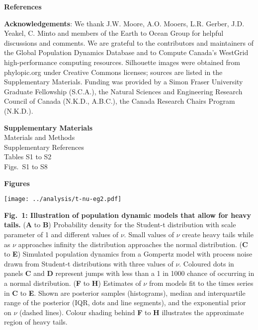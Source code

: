 \textbf{References}

\renewcommand{\section}[2]{}%



\textbf{Acknowledgements}: We thank J.W. Moore, A.O. Mooers, L.R. Gerber, J.D.
Yeakel, C. Minto and members of the Earth to Ocean Group for helpful
discussions and comments. We are grateful to the contributors and maintainers
of the Global Population Dynamics Database and to Compute Canada's WestGrid
high-performance computing resources. Silhouette images were obtained from
phylopic.org under Creative Commons licenses; sources are listed in the
Supplementary Materials. Funding was provided by a Simon Fraser University
Graduate Fellowship (S.C.A.), the Natural Sciences and Engineering Research
Council of Canada (N.K.D., A.B.C.), the Canada Research Chairs Program
(N.K.D.).

\textbf{Supplementary Materials}\\
Materials and Methods\\
Supplementary References\\
Tables S1 to S2\\
Figs.~S1 to S8\\


\clearpage

\textbf{Figures}

\begin{center}
\texttt{[image: ../analysis/t-nu-eg2.pdf]}
\end{center}

\textbf{Fig.~1: Illustration of population dynamic models that allow for heavy
tails.} (\textbf{A} to \textbf{B}) Probability density for the Student-t
distribution with scale parameter of 1 and different values of \(\nu\). Small
values of \(\nu\) create heavy tails while as \(\nu\) approaches infinity the
distribution approaches the normal distribution. (\textbf{C} to \textbf{E})
Simulated population dynamics from a Gompertz model with process noise drawn
from Student-t distributions with three values of \(\nu\). Coloured dots in
panels \textbf{C} and \textbf{D} represent jumps with less than a 1 in 1000
chance of occurring in a normal distribution. (\textbf{F} to \textbf{H})
Estimates of \(\nu\) from models fit to the times series in \textbf{C} to
\textbf{E}. Shown are posterior samples (histograms), median and interquartile
range of the posterior (IQR, dots and line segments), and the exponential prior
on \(\nu\) (dashed lines). Colour shading behind \textbf{F} to \textbf{H}
illustrates the approximate region of heavy tails.

